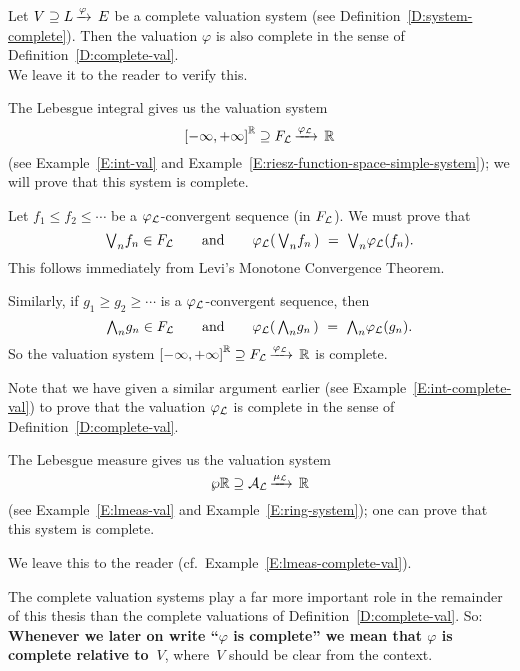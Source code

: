 \documentclass[main.tex]{subfiles}
\begin{document}
%
%
\begin{rem}
Let $V \supseteq L\,\smash{\xrightarrow{\varphi}\,E}$ be a complete valuation
system
(see Definition~\ref{D:system-complete}).
Then the valuation $\varphi$
is also complete in the sense
of Definition~\ref{D:complete-val}.\\
We leave it to the reader to verify this.
\end{rem}
%
%
\begin{ex}
\label{E:complete-lint}
The Lebesgue integral
gives us the   valuation system
\begin{equation*}
{[-\infty,+\infty]}^{\mathbb{R}} \supseteq F_{\mathcal{L}}\,\smash{\xrightarrow{\varphi_{\mathcal{L}}}\,\mathbb{R}}
\end{equation*}
(see Example~\ref{E:int-val} and
Example~\ref{E:riesz-function-space-simple-system});
we will prove that this system is complete.

Let $f_1 \leq f_2 \leq \dotsb$
be a $\varphi_{\mathcal{L}}$-convergent sequence (in $F_{\mathcal{L}}$).
We must prove that 
\begin{equation*}
\textstyle{\bigvee}_n f_n \in F_{\mathcal{L}}
\qquad\text{and}\qquad\varphi_{\mathcal{L}}(\,\textstyle{\bigvee}_n f_n\,) \ =\  \textstyle{\bigvee}_n \varphi_{\mathcal{L}} (f_n).
\end{equation*}
This follows immediately from Levi's Monotone Convergence Theorem.

Similarly,
if $g_1 \geq g_2 \geq \dotsb$
is a $\varphi_{\mathcal{L}}$-convergent sequence,
then
\begin{equation*}
\textstyle{\bigwedge}_n g_n \in F_{\mathcal{L}}
\qquad\text{and}\qquad\varphi_{\mathcal{L}}(\,\textstyle{\bigwedge}_n g_n\,) \ =\  \textstyle{\bigwedge}_n \varphi_{\mathcal{L}} (g_n).
\end{equation*}
So the  valuation system ${[-\infty,+\infty]}^{\mathbb{R}} \supseteq F_{\mathcal{L}}\,\smash{\xrightarrow{\varphi_{\mathcal{L}}}\,\mathbb{R}}$ is complete.

Note that we have given a similar argument earlier 
(see Example~\ref{E:int-complete-val}) to prove
that the valuation $\varphi_{\mathcal{L}}$
is complete in the sense of Definition~\ref{D:complete-val}.
\end{ex}
%
%
\begin{ex}
\label{E:complete-lmeas}
The Lebesgue measure
gives us the   valuation system
\begin{equation*}
\wp{\mathbb{R}} \supseteq \mathcal{A}_{\mathcal{L}}\,\smash{\xrightarrow{\mu_{\mathcal{L}}}\,\mathbb{R}}
\end{equation*}
(see Example~\ref{E:lmeas-val} and
Example~\ref{E:ring-system});
one can prove that this system is complete.

We leave this to the reader (cf.~Example~\ref{E:lmeas-complete-val}).
\end{ex}
%
%
%
\begin{cnv}
The complete valuation systems play a far more important
role in the remainder of this thesis
than the complete valuations of Definition~\ref{D:complete-val}.
So:\\
\textbf{Whenever we later on write ``$\varphi$ is complete'' 
we mean that  $\varphi$ is complete relative to~$V$},
where~$V$ should be clear from the context.
\end{cnv}
\end{document}
